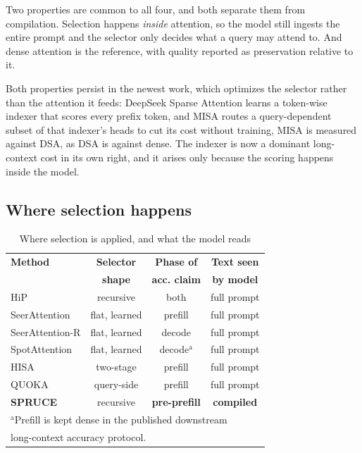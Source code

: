\documentclass[conference]{IEEEtran}
\begin{document}
Two properties are common to all four, and both separate them from compilation.
Selection happens \emph{inside} attention, so the model still ingests the entire
prompt and the selector only decides what a query may attend to. And dense attention
is the reference, with quality reported as preservation relative to it.

Both properties persist in the newest work, which optimizes the selector rather than
the attention it feeds: DeepSeek Sparse Attention \cite{dsa} learns a token-wise
indexer that scores every prefix token, and MISA \cite{misa} routes a
query-dependent subset of that indexer's heads to cut its cost without training,
MISA is measured against DSA, as DSA is against dense. The indexer is now a dominant
long-context cost in its own right, and it arises only because the scoring happens
inside the model.

\subsection{Where selection happens}

\begin{table}[t]
\caption{Where selection is applied, and what the model reads}
\begin{center}
\renewcommand{\arraystretch}{1.05}
\begin{tabular}{|l|c|c|c|}
\hline
\textbf{Method} & \textbf{Selector} & \textbf{Phase of} & \textbf{Text seen} \\
 & \textbf{shape} & \textbf{acc. claim} & \textbf{by model} \\
\hline
HiP \cite{hip} & recursive & both & full prompt \\
SeerAttention \cite{seer} & flat, learned & prefill & full prompt \\
SeerAttention-R \cite{seerr} & flat, learned & decode & full prompt \\
SpotAttention \cite{spot} & flat, learned & decode$^{\mathrm{a}}$ & full prompt \\
HISA \cite{hisa} & two-stage & prefill & full prompt \\
QUOKA \cite{quoka} & query-side & prefill & full prompt \\
\hline
\textbf{SPRUCE} & recursive & \textbf{pre-prefill} & \textbf{compiled} \\
\hline
\multicolumn{4}{l}{\footnotesize $^{\mathrm{a}}$Prefill is kept dense in the published downstream}\\
\multicolumn{4}{l}{\footnotesize long-context accuracy protocol.}
\end{tabular}
\label{tab1}
\end{center}
\end{table}
\end{document}
